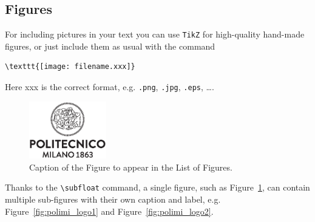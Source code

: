 \documentclass{Configuration_Files/PoliMi3i_thesis}
\begin{document}
\subsection{Figures}
\label{subsec:figures}

For including pictures in your text you can use \texttt{TikZ} for high-quality hand-made figures,
or just include them as usual with the command
\begin{verbatim}
\texttt{[image: filename.xxx]}
\end{verbatim}
Here xxx is the correct format, e.g. \verb|.png|, \verb|.jpg|, \verb|.eps|, \dots.

\begin{figure}[H]
\centering
\includegraphics[width=0.3\textwidth]{logo_polimi_scritta.eps}
\caption{Caption of the Figure to appear in the List of Figures.}
\label{fig:quadtree}
\end{figure}

Thanks to the \texttt{\textbackslash subfloat} command, a single figure, such as Figure~\ref{fig:quadtree},
can contain multiple sub-figures with their own caption and label, e.g. \color{black} Figure~\ref{fig:polimi_logo1}
and Figure~\ref{fig:polimi_logo2}.
\end{document}
